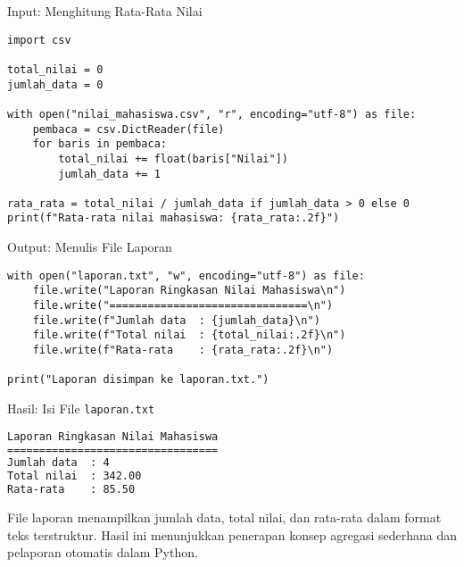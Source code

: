 \documentclass[aspectratio=169, table]{beamer}
\begin{document}
\begin{frame}[fragile]{Input: Menghitung Rata-Rata Nilai}
\vspace{20pt}
\begin{lstlisting}[style=PythonStyle, caption={Menghitung rata-rata dari file CSV}]
import csv

total_nilai = 0
jumlah_data = 0

with open("nilai_mahasiswa.csv", "r", encoding="utf-8") as file:
    pembaca = csv.DictReader(file)
    for baris in pembaca:
        total_nilai += float(baris["Nilai"])
        jumlah_data += 1

rata_rata = total_nilai / jumlah_data if jumlah_data > 0 else 0
print(f"Rata-rata nilai mahasiswa: {rata_rata:.2f}")
\end{lstlisting}
\end{frame}

\begin{frame}[fragile]{Output: Menulis File Laporan}
\vspace{20pt}
\begin{lstlisting}[style=PythonStyle, caption={Menyimpan hasil agregasi ke file laporan}]
with open("laporan.txt", "w", encoding="utf-8") as file:
    file.write("Laporan Ringkasan Nilai Mahasiswa\n")
    file.write("===============================\n")
    file.write(f"Jumlah data  : {jumlah_data}\n")
    file.write(f"Total nilai  : {total_nilai:.2f}\n")
    file.write(f"Rata-rata    : {rata_rata:.2f}\n")

print("Laporan disimpan ke laporan.txt.")
\end{lstlisting}
\end{frame}

\begin{frame}[fragile]{Hasil: Isi File \texttt{laporan.txt}}
\vspace{20pt}
\begin{lstlisting}[language=bash, caption={Isi file hasil ringkasan data}]
Laporan Ringkasan Nilai Mahasiswa
=================================
Jumlah data  : 4
Total nilai  : 342.00
Rata-rata    : 85.50
\end{lstlisting}

File laporan menampilkan jumlah data, total nilai, dan rata-rata dalam format teks terstruktur.  
Hasil ini menunjukkan penerapan konsep agregasi sederhana dan pelaporan otomatis dalam Python.
\end{frame}
\end{document}

